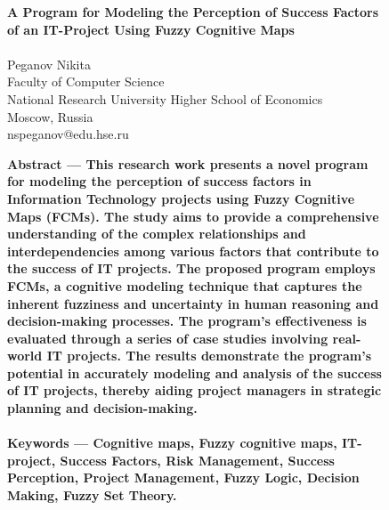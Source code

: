 \documentclass{article}
\begin{document}
    \thispagestyle{empty}
    \begin{figure}[!t]
        \begin{center}
            \fontsize{18}{20}\selectfont
            \textbf{
                A Program for Modeling the Perception of Success Factors\\
                of an IT-Project Using Fuzzy Cognitive Maps\\
            }
            ~\\
            \fontsize{14}{16}\selectfont
            Peganov Nikita\\
            Faculty of Computer Science\\
            National Research University Higher School of Economics\\
            Moscow, Russia\\
            nspeganov@edu.hse.ru\\
        \end{center}
        \fontsize{8}{7}\selectfont
        \begin{minipage}{0.49\textwidth}
            \textbf{Abstract — This research work presents a novel program for modeling the perception of success factors in Information Technology projects using Fuzzy Cognitive Maps (FCMs). The study aims to provide a comprehensive understanding of the complex relationships and interdependencies among various factors that contribute to the success of IT projects. The proposed program employs FCMs, a cognitive modeling technique that captures the inherent fuzziness and uncertainty in human reasoning and decision-making processes. The program's effectiveness is evaluated through a series of case studies involving real-world IT projects. The results demonstrate the program's potential in accurately modeling and analysis of the success of IT projects, thereby aiding project managers in strategic planning and decision-making.}\\
            ~\\
            \textbf{Keywords — Cognitive maps, Fuzzy cognitive maps, IT-project, Success Factors, Risk Management, Success Perception, Project Management, Fuzzy Logic, Decision Making, Fuzzy Set Theory.}\\
            ~\\
            \begin{center}

\end{center}
\end{minipage}
\end{figure}
\end{document}
